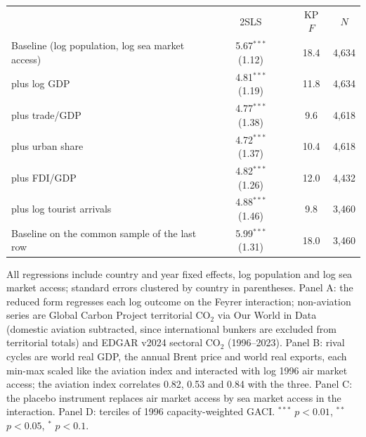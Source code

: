 \documentclass[12pt]{article}
\begin{document}
\begin{table}[H]
{\begin{threeparttable}
\begin{tabular}{lcccc}
 & 2SLS & & KP $F$ & $N$ \\
  Baseline (log population, log sea market access) & 5.67$^{***}$ (1.12) & & 18.4 & 4,634 \\
  \quad plus log GDP & 4.81$^{***}$ (1.19) & & 11.8 & 4,634 \\
  \quad plus trade/GDP & 4.77$^{***}$ (1.38) & & 9.6 & 4,618 \\
  \quad plus urban share & 4.72$^{***}$ (1.37) & & 10.4 & 4,618 \\
  \quad plus FDI/GDP & 4.82$^{***}$ (1.26) & & 12.0 & 4,432 \\
  \quad plus log tourist arrivals & 4.88$^{***}$ (1.46) & & 9.8 & 3,460 \\
  Baseline on the common sample of the last row & 5.99$^{***}$ (1.31) & & 18.0 & 3,460 \\
\bottomrule
\end{tabular}
\begin{tablenotes}\scriptsize
\item All regressions include country and year fixed effects, log population and log sea market access; standard errors clustered by country in parentheses. Panel A: the reduced form regresses each log outcome on the Feyrer interaction; non-aviation series are Global Carbon Project territorial CO$_2$ via Our World in Data (domestic aviation subtracted, since international bunkers are excluded from territorial totals) and EDGAR v2024 sectoral CO$_2$ (1996--2023). Panel B: rival cycles are world real GDP, the annual Brent price and world real exports, each min-max scaled like the aviation index and interacted with log 1996 air market access; the aviation index correlates 0.82, 0.53 and 0.84 with the three. Panel C: the placebo instrument replaces air market access by sea market access in the interaction. Panel D: terciles of 1996 capacity-weighted GACI. $^{***}$ $p<0.01$, $^{**}$ $p<0.05$, $^{*}$ $p<0.1$.
\end{tablenotes}
\end{threeparttable}}
\end{table}
\end{document}
